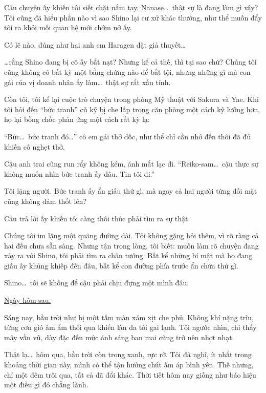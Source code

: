 \documentclass[../main.tex]{subfiles}
\begin{document}
Câu chuyện ấy khiến tôi siết chặt nắm tay. Nanase\dots\ thật sự là đang làm gì vậy? Tôi cũng đã hiểu phần nào vì sao Shino lại cư xử khác thường, như thể muốn đẩy tôi ra khỏi mối quan hệ mới chớm nở ấy.

Có lẽ nào, đúng như hai anh em Haragen đặt giả thuyết\dots

\dots rằng Shino đang bị cô ấy bắt nạt? Nhưng kể cả thế, thì tại sao chứ? Chúng tôi cũng không có bất kỳ một bằng chứng nào để bắt tội, nhưng những gì mà con gái của vị doanh nhân ấy làm\dots\ thật sự rất xấu tính.

Còn tôi, tôi kể lại cuộc trò chuyện trong phòng Mỹ thuật với Sakura và Yae. Khi tôi hỏi đến ``bức tranh'' cũ kỹ bị che lấp trong căn phòng một cách kỹ lưỡng hơn, họ lại bỗng chốc phản ứng một cách rất kỳ lạ:

``Bức\dots\ bức tranh đó\dots'' cô em gái thở dốc, như thể chỉ cần nhớ đến thôi đã đủ khiến cô nghẹt thở.

Cậu anh trai cũng run rẩy không kém, ánh mắt lạc đi. ``Reiko-sam\dots\ cậu thực sự không muốn nhìn bức tranh ấy đâu. Tin tôi đi.''

Tôi lặng người. Bức tranh ấy ẩn giấu thứ gì, mà ngay cả hai người từng đối mặt cũng không dám thốt lên?

Câu trả lời ấy khiến tôi càng thôi thúc phải tìm ra sự thật.

Chúng tôi im lặng một quãng đường dài. Tôi không gặng hỏi thêm, vì rõ ràng cả hai đều chưa sẵn sàng. Nhưng tận trong lòng, tôi biết: muốn làm rõ chuyện đang xảy ra với Shino, tôi phải tìm ra chân tướng. Bất kể những bí mật mà họ đang giấu ấy khủng khiếp đến đâu, bất kể con đường phía trước ẩn chứa thứ gì.

Shino\dots\ tôi sẽ không để cậu phải chịu đựng một mình đâu.

\begin{center}
  \uline{Ngày hôm sau.}
\end{center}

Sáng nay, bầu trời như bị một tấm màn xám xịt che phủ. Không khí nặng trĩu, từng cơn gió âm ẩm thổi qua khiến làn da tôi gai lạnh. Tôi ngước nhìn, chỉ thấy mây vần vũ, dày đặc đến mức ánh sáng ban mai cũng trở nên nhợt nhạt.

Thật lạ\dots\ hôm qua, bầu trời còn trong xanh, rực rỡ. Tôi đã nghĩ, ít nhất trong khoảng thời gian này, mình có thể tận hưởng chút ấm áp bình yên. Thế nhưng, chỉ một đêm trôi qua, tất cả đã đổi khác. Thời tiết hôm nay giống như báo hiệu một điều gì đó chẳng lành.
\end{document}
